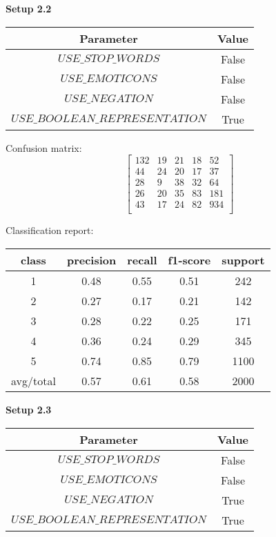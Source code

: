 \documentclass[12pt]{report}
\begin{document}
\textbf{Setup 2.2}

\begin{center}
	\begin{tabular}{ c | c }
		\hline
		Parameter & Value \\ \hline
		$USE\_STOP\_WORDS$ & False \\ \hline
		$USE\_EMOTICONS$ & False \\ \hline
		$USE\_NEGATION$ & False \\ \hline
		$USE\_BOOLEAN\_REPRESENTATION$ & True \\ \hline
	\end{tabular}
\end{center}

Confusion matrix:
\[
\begin{bmatrix}
132 & 19 & 21 & 18 & 52 \\
44 & 24 & 20 & 17 & 37 \\
28 &  9 & 38 & 32 & 64 \\
26 & 20 & 35 & 83 & 181 \\
43 & 17 & 24 & 82 & 934 \\
\end{bmatrix}
\]

Classification report:

\begin{center}
	\begin{tabular}{c | c | c | c | c }
		\hline
		class & precision & recall & f1-score & support \\ \hline
		1 & 0.48 & 0.55 & 0.51 & 242 \\ \hline
		2 & 0.27 & 0.17 & 0.21 & 142 \\ \hline
		3 & 0.28 & 0.22 & 0.25 & 171 \\ \hline
		4 & 0.36 & 0.24 & 0.29 & 345 \\ \hline
		5 & 0.74 & 0.85 & 0.79 & 1100 \\ \hline
		avg/total & 0.57 & 0.61 & 0.58 & 2000 \\ \hline
	\end{tabular}
\end{center}


\textbf{Setup 2.3}

\begin{center}
	\begin{tabular}{ c | c }
		\hline
		Parameter & Value \\ \hline
		$USE\_STOP\_WORDS$ & False \\ \hline
		$USE\_EMOTICONS$ & False \\ \hline
		$USE\_NEGATION$ & True \\ \hline
		$USE\_BOOLEAN\_REPRESENTATION$ & True \\ \hline
	\end{tabular}
\end{center}
\end{document}
